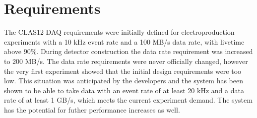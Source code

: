 \section{Requirements}

The CLAS12 DAQ requirements were initially defined for electroproduction experiments with a 10 kHz event rate and a 100 MB/s data rate, with livetime above 90\%. During detector construction the data rate requirement was increased to 200 MB/s. The data rate requirements were never officially changed, however the very first experiment showed that the initial design requirements were too low. This situation was anticipated by the developers and the system has been shown to be able to take data with an event rate of at least 20 kHz and a data rate of at least 1 GB/s, which meets the current experiment demand. The system has the potential for futher performance increases as well.

